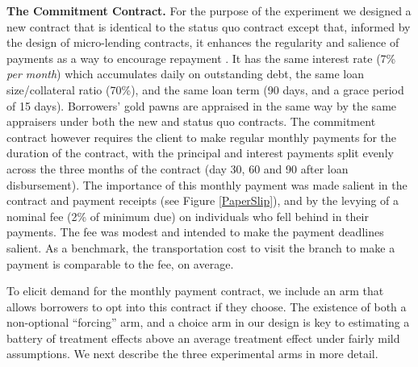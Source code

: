 \documentclass[11pt, a4paper]{article}
\begin{document}
\vspace{.2in}
\noindent \textbf{The Commitment Contract.} For the purpose of the experiment we designed a new contract that is identical to the status quo contract except that, informed by the design of micro-lending contracts, it enhances the regularity and salience of payments as a way to encourage repayment \citep{morduch1999microfinance, bauer2012behavioral}.  It has the same interest rate (7\% \textit{per month}) which accumulates daily on outstanding debt, the same loan size/collateral ratio (70\%), and the same loan term (90 days, and a grace period of 15 days). Borrowers' gold pawns are appraised in the same way by the same appraisers under both the new and status quo contracts. The commitment contract however requires the client to make regular monthly payments for the duration of the contract, with the principal and interest payments split evenly across the three months of the contract (day 30, 60 and 90 after loan disbursement). The importance of this monthly payment was made salient in the contract and payment receipts (see Figure \ref{PaperSlip}), and by the levying of a nominal fee (2\% of minimum due) on individuals who fell behind in their payments. %
The fee was modest and intended to make the payment deadlines salient. As a benchmark, the transportation cost to visit the branch to make a payment is comparable to the fee, on average.

To elicit demand for the monthly payment contract, we include an arm that allows borrowers to opt into this contract if they choose. The existence of both a non-optional ``forcing'' arm, and a choice arm in our design is key to estimating a battery of treatment effects above an average treatment effect under fairly mild assumptions. We next describe the three experimental arms in more detail. 
\end{document}
